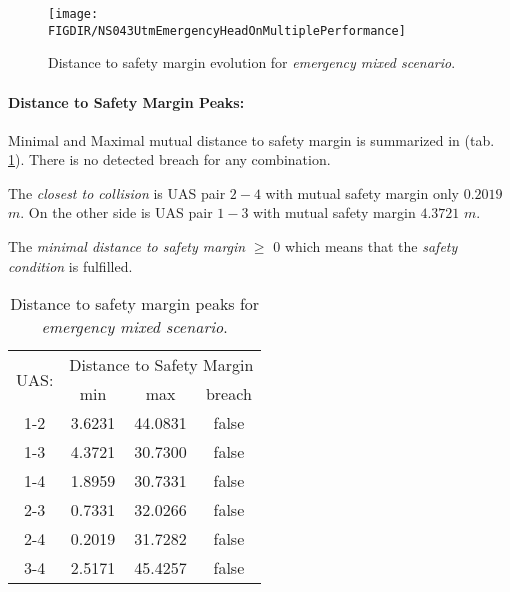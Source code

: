     \begin{figure}[H]
        \centering
        \texttt{[image: \\FIGDIR/NS043UtmEmergencyHeadOnMultiplePerformance]} 
        \caption{Distance to safety margin evolution for \emph{emergency mixed scenario}.}
        \label{fig:testCaseMultipleAvoidancePerformance}
    \end{figure}
    
    \paragraph{Distance to Safety Margin Peaks:} Minimal and Maximal mutual distance to safety margin is summarized in (tab. \ref{tab:testCaseEmergencyMixedSafetyMarginDistances}). There is no detected breach for any combination. 
    
    The \emph{closest to collision} is UAS pair $2-4$ with mutual safety margin only $0.2019$ $m$. On the other side is UAS pair $1-3$ with mutual safety margin $4.3721$ $m$. 
    
    The \emph{minimal distance to safety margin}  $\ge$ 0 which means that the \emph{safety condition} is fulfilled. 
    
    \begin{table}[H]
        \centering
        \begin{tabular}{c||c|c|c}
            \multirow{2}{*}{UAS:} & \multicolumn{3}{c}{Distance to Safety Margin} \\ \cline{2-4} 
                      & min          & max         & breach         \\ \hline\hline
                1-2   & 3.6231       & 44.0831     & false          \\ \hline
                1-3   & 4.3721       & 30.7300     & false          \\ \hline
                1-4   & 1.8959       & 30.7331     & false          \\ \hline
                2-3   & 0.7331       & 32.0266     & false          \\ \hline
                2-4   & 0.2019       & 31.7282     & false          \\ \hline
                3-4   & 2.5171       & 45.4257     & false          \\ 
        \end{tabular}
        \caption{Distance to safety margin peaks for \emph{emergency mixed scenario}.}
        \label{tab:testCaseEmergencyMixedSafetyMarginDistances}
    \end{table}
    

